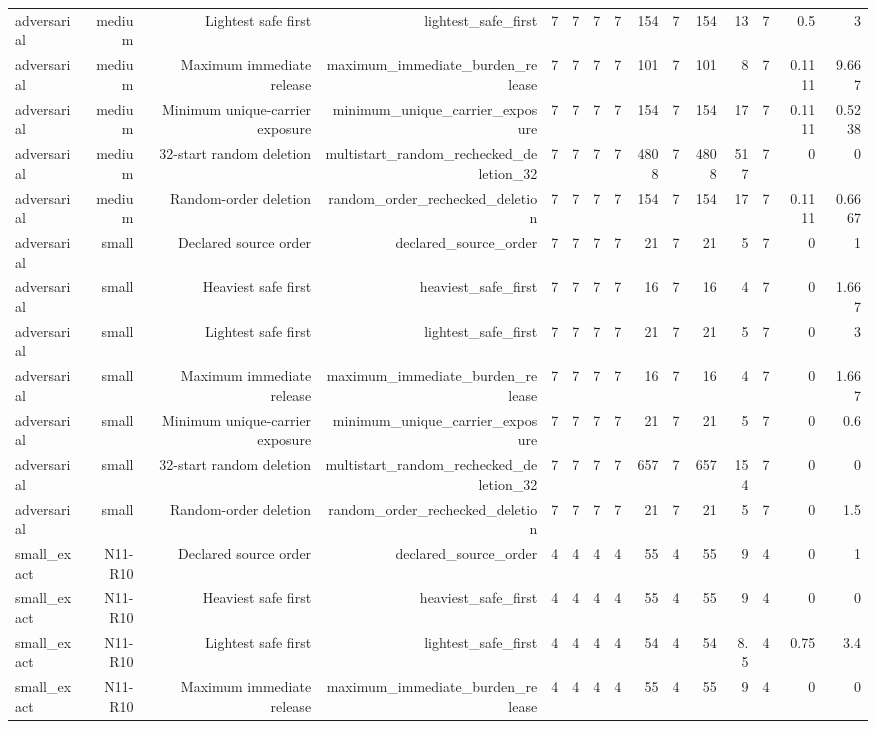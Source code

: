 {\begin{longtable}{lrrrrrrrrrrrrrr}
adversarial & medium & Lightest safe first & lightest\_safe\_first & 7 & 7 & 7 & 7 & 154 & 7 & 154 & 13 & 7 & 0.5 & 3 \\
adversarial & medium & Maximum immediate release & maximum\_immediate\_burden\_release & 7 & 7 & 7 & 7 & 101 & 7 & 101 & 8 & 7 & 0.1111 & 9.667 \\
adversarial & medium & Minimum unique-carrier exposure & minimum\_unique\_carrier\_exposure & 7 & 7 & 7 & 7 & 154 & 7 & 154 & 17 & 7 & 0.1111 & 0.5238 \\
adversarial & medium & 32-start random deletion & multistart\_random\_rechecked\_deletion\_32 & 7 & 7 & 7 & 7 & 4808 & 7 & 4808 & 517 & 7 & 0 & 0 \\
adversarial & medium & Random-order deletion & random\_order\_rechecked\_deletion & 7 & 7 & 7 & 7 & 154 & 7 & 154 & 17 & 7 & 0.1111 & 0.6667 \\
adversarial & small & Declared source order & declared\_source\_order & 7 & 7 & 7 & 7 & 21 & 7 & 21 & 5 & 7 & 0 & 1 \\
adversarial & small & Heaviest safe first & heaviest\_safe\_first & 7 & 7 & 7 & 7 & 16 & 7 & 16 & 4 & 7 & 0 & 1.667 \\
adversarial & small & Lightest safe first & lightest\_safe\_first & 7 & 7 & 7 & 7 & 21 & 7 & 21 & 5 & 7 & 0 & 3 \\
adversarial & small & Maximum immediate release & maximum\_immediate\_burden\_release & 7 & 7 & 7 & 7 & 16 & 7 & 16 & 4 & 7 & 0 & 1.667 \\
adversarial & small & Minimum unique-carrier exposure & minimum\_unique\_carrier\_exposure & 7 & 7 & 7 & 7 & 21 & 7 & 21 & 5 & 7 & 0 & 0.6 \\
adversarial & small & 32-start random deletion & multistart\_random\_rechecked\_deletion\_32 & 7 & 7 & 7 & 7 & 657 & 7 & 657 & 154 & 7 & 0 & 0 \\
adversarial & small & Random-order deletion & random\_order\_rechecked\_deletion & 7 & 7 & 7 & 7 & 21 & 7 & 21 & 5 & 7 & 0 & 1.5 \\
small\_exact & N11-R10 & Declared source order & declared\_source\_order & 4 & 4 & 4 & 4 & 55 & 4 & 55 & 9 & 4 & 0 & 1 \\
small\_exact & N11-R10 & Heaviest safe first & heaviest\_safe\_first & 4 & 4 & 4 & 4 & 55 & 4 & 55 & 9 & 4 & 0 & 0 \\
small\_exact & N11-R10 & Lightest safe first & lightest\_safe\_first & 4 & 4 & 4 & 4 & 54 & 4 & 54 & 8.5 & 4 & 0.75 & 3.4 \\
small\_exact & N11-R10 & Maximum immediate release & maximum\_immediate\_burden\_release & 4 & 4 & 4 & 4 & 55 & 4 & 55 & 9 & 4 & 0 & 0 \\

\end{longtable}}
